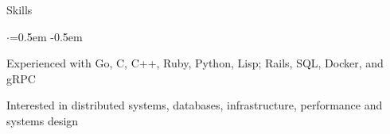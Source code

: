 \documentclass{resume} %
\begin{document}

\begin{rSection}{Skills}
  \vspace {0.2em}
  \begin{list}{$\cdot$}{\leftmargin=0.5em}
    \itemsep -0.5em \vspace{-0.3em}
    \item Experienced with Go, C, C++, Ruby, Python, Lisp; Rails, SQL, Docker, and gRPC
    \item Interested in distributed systems, databases, infrastructure,
      performance and systems design
  \end{list}
  \vspace{0.1em}
\end{rSection}


\end{document}
